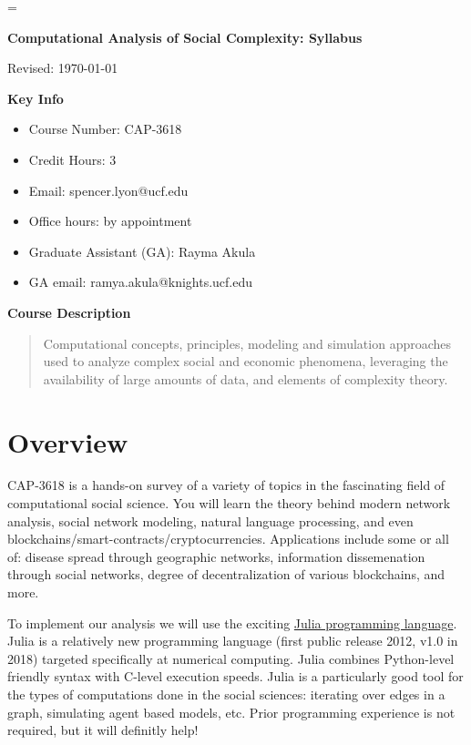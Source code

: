 \documentclass[11pt]{article}
\begin{document}
\parskip=\bigskipamount
\parindent=0.0in
\thispagestyle{empty}


\bigskip\bigskip
\centerline{\Large \bf Computational Analysis of Social Complexity:  Syllabus}
\centerline{Revised: \today}

\textbf{Key Info}

\begin{itemize}[label={}]
    \setlength\itemsep{0.2em}
    \item Course Number:  CAP-3618
    \item Credit Hours: 3
    \item Email: spencer.lyon@ucf.edu
    \item Office hours: by appointment
    \item Graduate Assistant (GA): Rayma Akula
    \item GA email: ramya.akula@knights.ucf.edu
\end{itemize}

\textbf{Course Description}
\begin{quote}
    Computational concepts, principles, modeling and simulation approaches used
    to analyze complex social and economic phenomena, leveraging the
    availability of large amounts of data, and elements of complexity theory.
\end{quote}


\section*{Overview}

CAP-3618 is a hands-on survey of a variety of topics in the fascinating field of
computational social science. You will learn the theory behind modern network
analysis, social network modeling, natural language processing, and even
blockchains/smart-contracts/cryptocurrencies.  Applications include some or all
of: disease spread through geographic networks, information dissemenation
through social networks, degree of decentralization of various blockchains, and
more.

To implement our analysis we will use the exciting
\href{https://julialang.org}{Julia programming language}. Julia is a relatively
new programming language (first public release 2012, v1.0 in 2018) targeted
specifically at numerical computing. Julia combines Python-level friendly syntax
with C-level execution speeds. Julia is a particularly good tool for the types
of computations done in the social sciences: iterating over edges in a graph,
simulating agent based models, etc. Prior programming experience is not
required, but it will definitly help!
\end{document}

